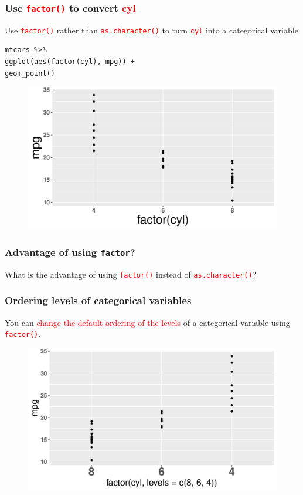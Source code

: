 \documentclass{beamer}
\begin{document}
\begin{frame}[fragile]\frametitle{Use \textcolor{red}{\texttt{factor()}} to convert \textcolor{red}{cyl}}
Use \textcolor{red}{\texttt{factor()}} rather than \textcolor{red}{\texttt{as.character()}} to turn \textcolor{red}{\texttt{cyl}} into a categorical variable

\begin{lstlisting}
mtcars %>%
ggplot(aes(factor(cyl), mpg)) +
geom_point()
\end{lstlisting}

\begin{figure}
\includegraphics[width=0.75\linewidth]{PlotsLec2/mpg_vs_cyl3}
\end{figure}
\end{frame}

\begin{frame}\frametitle{Advantage of using \texttt{factor}?}
\Large
What is the advantage of using \textcolor{red}{\texttt{factor()}} instead of \textcolor{red}{\texttt{as.character()}}?
\end{frame}

\begin{frame}[fragile]\frametitle{Ordering levels of categorical variables}
You can \textcolor{red}{change the default ordering of the levels} of a categorical variable using \textcolor{red}{\texttt{factor()}}. 
\begin{figure}
\includegraphics[width=0.99\linewidth]{PlotsLec2/mpg_vs_cyl4}
\end{figure}
\end{frame}
\end{document}
